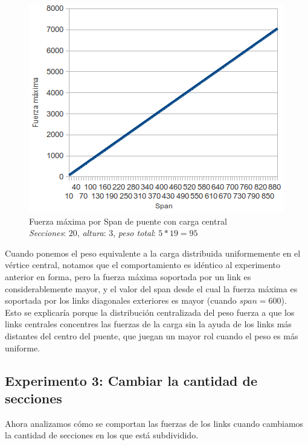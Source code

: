 \begin{figure}[h!]
\begin{center}
\includegraphics[scale=0.8]{archivos/graficos/Fuerza-x-span-peso-central.png}
\caption{\label{fig:fuerza_x_span_peso_central}Fuerza máxima por Span de puente con carga central\\
\textit{Secciones}: $20$, \textit{altura}: $3$, \textit{peso total}: $5 * 19 = 95$}
\end{center}
\end{figure}

Cuando ponemos el peso equivalente a la carga distribuida uniformemente en el 
vértice central, notamos que el comportamiento es idéntico al experimento 
anterior en forma, pero la fuerza máxima soportada por un link es considerablemente mayor, y el valor del span desde el cual la fuerza máxima es soportada por los links diagonales exteriores es mayor (cuando $span = 600$).\\

Esto se explicaría porque la distribución centralizada del peso fuerza a que los links centrales concentres las fuerzas de la carga sin la ayuda de los links más distantes del centro del puente, que juegan un mayor rol cuando el peso es más uniforme.

\newpage 
\subsection{Experimento 3: Cambiar la cantidad de secciones}

Ahora analizamos cómo se comportan las fuerzas de los links cuando cambiamos la cantidad de secciones en los que está subdividido.\\

